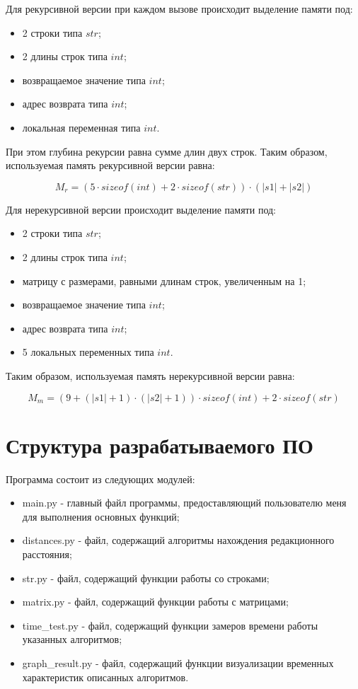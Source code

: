 Для рекурсивной версии при каждом вызове происходит выделение памяти под:

\begin{itemize}
	\item 2 строки типа $str$;
	\item 2 длины строк типа $int$;
	\item возвращаемое значение типа $int$;
	\item адрес возврата типа $int$;
	\item локальная переменная типа $int$.
\end{itemize}

При этом глубина рекурсии равна сумме длин двух строк. Таким образом, используемая память рекурсивной версии равна:

\begin{equation}
	\label{eq:rm}
	M_{r} = (5 \cdot sizeof(int)+2 \cdot sizeof(str))\cdot(|s1|+|s2|)
\end{equation}

Для нерекурсивной версии происходит выделение памяти под:

\begin{itemize}
	\item 2 строки типа $str$;
	\item 2 длины строк типа $int$;
	\item матрицу с размерами, равными длинам строк, увеличенным на 1;
	\item возвращаемое значение типа $int$;
	\item адрес возврата типа $int$;
	\item 5 локальных переменных типа $int$.
\end{itemize}

Таким образом, используемая память нерекурсивной версии равна:

\begin{equation}
	\label{eq:mm}
	M_{m} = (9+(|s1|+1) \cdot (|s2|+1)) \cdot sizeof(int)+2 \cdot sizeof(str)
\end{equation}

\section{Структура разрабатываемого ПО}

Программа состоит из следующих модулей:

\begin{itemize}
	\item main.py - главный файл программы, предоставляющий пользователю меня для выполнения основных функций;
	\item distances.py - файл, содержащий алгоритмы нахождения редакционного расстояния;
	\item str.py - файл, содержащий функции работы со строками;
	\item matrix.py - файл, содержащий функции работы с матрицами;
	\item time\_test.py - файл, содержащий функции замеров времени работы указанных алгоритмов;
	\item graph\_result.py - файл, содержащий функции визуализации временных характеристик описанных алгоритмов.
\end{itemize}

